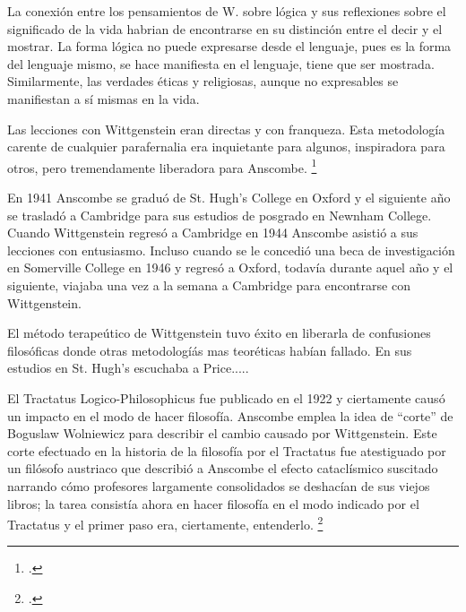 
La conexión entre los pensamientos de W. sobre lógica y sus reflexiones sobre el
significado de la vida habrian de encontrarse en su distinción entre el decir y
el mostrar. La forma lógica no puede expresarse desde el lenguaje, pues es la
forma del lenguaje mismo, se hace manifiesta en el lenguaje, tiene que ser
mostrada. Similarmente, las verdades éticas y religiosas, aunque no expresables
se manifiestan a sí mismas en la vida. 

Las lecciones con Wittgenstein eran directas y con franqueza. Esta metodología
carente de cualquier parafernalia era inquietante para algunos, inspiradora para
otros, pero tremendamente liberadora para Anscombe. \footcite[loc 9853 Chapter
4, Section 24, para. 5]{monk}

En 1941 Anscombe se graduó de St. Hugh's College en Oxford y el siguiente año se
trasladó a Cambridge para sus estudios de posgrado en Newnham College. Cuando
Wittgenstein regresó a Cambridge en 1944 Anscombe asistió a sus lecciones con
entusiasmo. Incluso cuando se le concedió una beca de investigación en
Somerville College en 1946 y regresó a Oxford, todavía durante aquel año y el
siguiente, viajaba una vez a la semana a Cambridge para encontrarse con
Wittgenstein.  

El método terapeútico de Wittgenstein tuvo éxito en liberarla de confusiones
filosóficas donde otras metodologíás mas teoréticas habían fallado. En sus
estudios en St. Hugh's escuchaba a Price.....



El Tractatus Logico-Philosophicus fue publicado en el 1922 y ciertamente causó
un impacto en el modo de hacer filosofía. Anscombe emplea la idea de ``corte''
de Boguslaw Wolniewicz para describir el cambio causado por Wittgenstein. Este
corte efectuado en la historia de la filosofía por el Tractatus fue atestiguado
por un filósofo austriaco que describió a Anscombe el efecto cataclísmico
suscitado narrando cómo profesores largamente consolidados se deshacían de sus
viejos libros; la tarea consistía ahora en hacer filosofía en el modo indicado
por el Tractatus y el primer paso era, ciertamente, entenderlo.
\footcite[p.181]{twocuts} 



